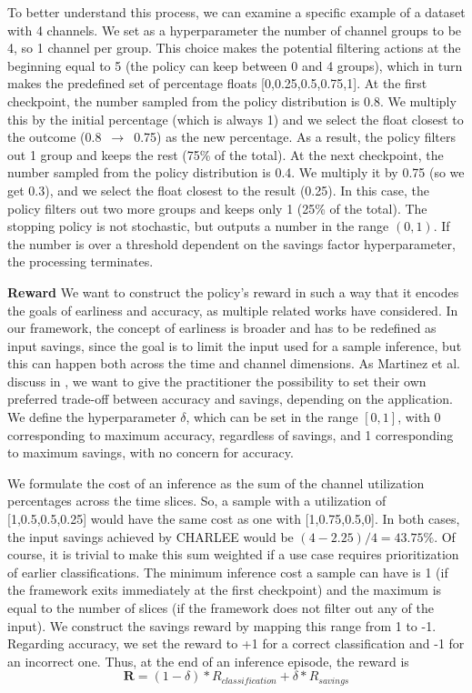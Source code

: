 \documentclass[conference]{IEEEtran}
\begin{document}
To better understand this process, we can examine a specific example of a dataset with 4 channels. We set as a hyperparameter the number of channel groups to be 4, so 1 channel per group. This choice makes the potential filtering actions at the beginning equal to 5 (the policy can keep between 0 and 4 groups), which in turn makes the predefined set of percentage floats [0,0.25,0.5,0.75,1]. At the first checkpoint, the number sampled from the policy distribution is 0.8. We multiply this by the initial percentage (which is always 1) and we select the float closest to the outcome (0.8 $\,\to\,$ 0.75) as the new percentage. As a result, the policy filters out 1 group and keeps the rest (75\% of the total). At the next checkpoint, the number sampled from the policy distribution is 0.4. We multiply it by 0.75 (so we get 0.3), and we select the float closest to the result (0.25). In this case, the policy filters out two more groups and keeps only 1 (25\% of the total).
The stopping policy is not stochastic, but outputs a number in the range $(0,1)$. If the number is over a threshold dependent on the savings factor hyperparameter, the processing terminates.

\textbf{Reward} We want to construct the policy's reward in such a way that it encodes the goals of earliness and accuracy, as multiple related works have considered\cite{mori2017early,martinez2018deep,martinez2020adaptive}. In our framework, the concept of earliness is broader and has to be redefined as input savings, since the goal is to limit the input used for a sample inference, but this can happen both across the time and channel dimensions. As Martinez et al. discuss in \cite{martinez2020adaptive}, we want to give the practitioner the possibility to set their own preferred trade-off between accuracy and savings, depending on the application. We define the hyperparameter $\delta$, which can be set in the range $[0,1]$, with 0 corresponding to maximum accuracy, regardless of savings, and 1 corresponding to maximum savings, with no concern for accuracy.

We formulate the cost of an inference as the sum of the channel utilization percentages across the time slices. So, a sample with a utilization of [1,0.5,0.5,0.25] would have the same cost as one with [1,0.75,0.5,0]. In both cases, the input savings achieved by CHARLEE would be $(4-2.25)/4 = 43.75\%$. Of course, it is trivial to make this sum weighted if a use case requires prioritization of earlier classifications. The minimum inference cost a sample can have is 1 (if the framework exits immediately at the first checkpoint) and the maximum is equal to the number of slices (if the framework does not filter out any of the input). We construct the savings reward by mapping this range from 1 to -1. Regarding accuracy, we set the reward to +1 for a correct classification and -1 for an incorrect one. Thus, at the end of an inference episode, the reward is \begin{equation}\label{eq:reward}
    \mathbf{R} = (1-\delta)*R_{classification} + \delta*R_{savings}
\end{equation}
\end{document}
